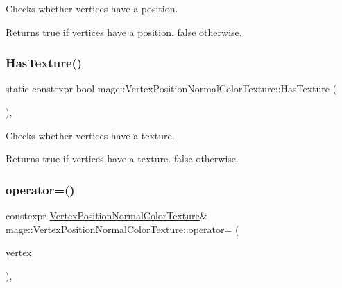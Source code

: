 Checks whether vertices have a position.

\begin{DoxyReturn}{Returns}
{\ttfamily true} if vertices have a position. {\ttfamily false} otherwise. 
\end{DoxyReturn}
\hypertarget{structmage_1_1_vertex_position_normal_color_texture_a27f5a115642f443419683417360fd58e}{}\label{structmage_1_1_vertex_position_normal_color_texture_a27f5a115642f443419683417360fd58e} 
\subsubsection{\texorpdfstring{Has\+Texture()}{HasTexture()}}
{\footnotesize\ttfamily static constexpr bool mage\+::\+Vertex\+Position\+Normal\+Color\+Texture\+::\+Has\+Texture (\begin{DoxyParamCaption}{ }\end{DoxyParamCaption})\hspace{0.3cm}{\ttfamily [static]}, {\ttfamily [noexcept]}}

Checks whether vertices have a texture.

\begin{DoxyReturn}{Returns}
{\ttfamily true} if vertices have a texture. {\ttfamily false} otherwise. 
\end{DoxyReturn}
\hypertarget{structmage_1_1_vertex_position_normal_color_texture_a97ad96dc018b200c1fd0c86586ddd5fc}{}\label{structmage_1_1_vertex_position_normal_color_texture_a97ad96dc018b200c1fd0c86586ddd5fc} 
\subsubsection{\texorpdfstring{operator=()}{operator=()}\hspace{0.1cm}{\footnotesize\ttfamily [1/2]}}
{\footnotesize\ttfamily constexpr \hyperlink{structmage_1_1_vertex_position_normal_color_texture}{Vertex\+Position\+Normal\+Color\+Texture}\& mage\+::\+Vertex\+Position\+Normal\+Color\+Texture\+::operator= (\begin{DoxyParamCaption}\item[{const \hyperlink{structmage_1_1_vertex_position_normal_color_texture}{Vertex\+Position\+Normal\+Color\+Texture} \&}]{vertex }\end{DoxyParamCaption})\hspace{0.3cm}{\ttfamily [default]}, {\ttfamily [noexcept]}}

